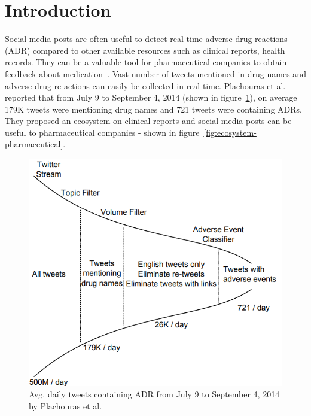 \section{Introduction}

Social media posts are often useful to detect real-time adverse drug reactions (ADR) compared to other available resources such as clinical reports, health records. They can be a valuable tool for pharmaceutical companies to obtain feedback about medication~\cite{plachouras2016quantifying, huynh2016adverse}. Vast number of tweets mentioned in drug names and adverse drug re-actions can easily be collected in real-time. Plachouras et al.~\cite{plachouras2016quantifying} reported that from July 9 to September 4, 2014 (shown in figure~\ref{fig:daily-tweets-adr}), on average 179K tweets were mentioning drug names and 721 tweets were containing ADRs. They proposed an ecosystem on clinical reports and social media posts can be useful to pharmaceutical companies - shown in figure~\ref{fig:ecosystem-pharmaceutical}.

\begin{figure}[h]
	\centering
	\includegraphics[width=0.99\linewidth]{Figures/g.png}
	\caption{Avg. daily tweets containing ADR from July 9 to September 4, 2014 by Plachouras et al.~\cite{plachouras2016quantifying}}
	\label{fig:daily-tweets-adr}
\end{figure}

